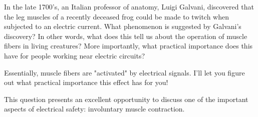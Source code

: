 

In the late 1700's, an Italian professor of anatomy, Luigi Galvani, discovered that the leg muscles of a recently deceased frog could be made to twitch when subjected to an electric current.  What phenomenon is suggested by Galvani's discovery?  In other words, what does this tell us about the operation of muscle fibers in living creatures?  More importantly, what practical importance does this have for people working near electric circuits?







Essentially, muscle fibers are "activated" by electrical signals.  I'll let you figure out what practical importance this effect has for you!







This question presents an excellent opportunity to discuss one of the important aspects of electrical safety: involuntary muscle contraction.




